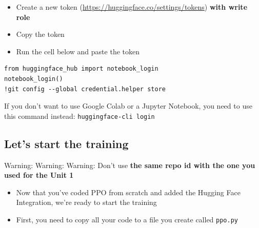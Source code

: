 \documentclass[11pt,a4paper]{article}
\begin{document}
\begin{itemize}
\tightlist
\item
  Create a new token (\url{https://huggingface.co/settings/tokens}) \textbf{with write role}
\end{itemize}


\begin{itemize}
\tightlist
\item
  Copy the token
\item
  Run the cell below and paste the token
\end{itemize}

\begin{lstlisting}
from huggingface_hub import notebook_login
notebook_login()
!git config --global credential.helper store
\end{lstlisting}

If you don't want to use Google Colab or a Jupyter Notebook, you need to use this command instead: \texttt{huggingface-cli\ login}

\subsection{Let's start the training}\label{lets-start-the-training}

Warning: Warning: Warning: Don't use \textbf{the same repo id with the one you used for the Unit 1}

\begin{itemize}
\item
  Now that you've coded PPO from scratch and added the Hugging Face Integration, we're ready to start the training
\item
  First, you need to copy all your code to a file you create called \texttt{ppo.py}
\end{itemize}


\end{document}
